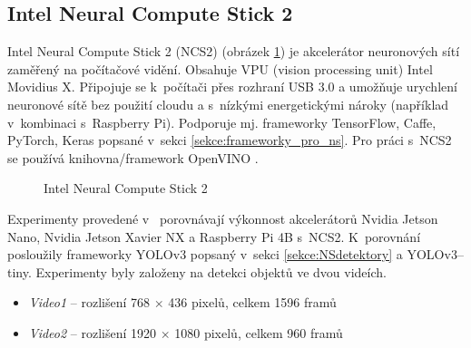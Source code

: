 \subsection*{Intel Neural Compute Stick 2}

Intel Neural Compute Stick 2 (NCS2) \cite{ncs2} (obrázek \ref{obrazek:ncs2}) je akcelerátor neuronových sítí zaměřený na počítačové vidění. Obsahuje VPU (vision processing unit) Intel Movidius X. Připojuje se k~počítači přes rozhraní USB 3.0 a umožňuje urychlení neuronové sítě bez použití cloudu a s~nízkými energetickými nároky (například v~kombinaci s~Raspberry Pi). Podporuje mj. frameworky TensorFlow, Caffe, PyTorch, Keras popsané v~sekci \ref{sekce:frameworky_pro_ns}. Pro práci s~NCS2 se používá knihovna/framework OpenVINO \cite{openvino}. 

\begin{figure}[H]
  \begin{center}
  \label{obrazek:ncs2}
  \caption{Intel Neural Compute Stick 2 \cite{ncs2}}
  \end{center}
\end{figure}

Experimenty provedené v~\cite{ncs2testYolo} porovnávají výkonnost akcelerátorů Nvidia Jetson Nano, Nvidia Jetson Xavier NX a Raspberry Pi 4B s~NCS2. K~porovnání posloužily frameworky YOLOv3 popsaný v~sekci \ref{sekce:NSdetektory} a YOLOv3--tiny. Experimenty byly založeny na detekci objektů ve dvou videích.
\begin{itemize}
  \item \emph{Video1} -- rozlišení 768 $\times$ 436 pixelů, celkem 1596 framů
  \item \emph{Video2} -- rozlišení 1920 $\times$ 1080 pixelů, celkem 960 framů 
\end{itemize}

